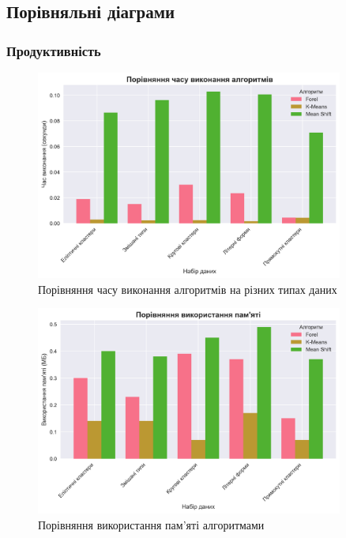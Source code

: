 \documentclass[12pt,a4paper]{article}
\begin{document}
\subsection{Порівняльні діаграми}

\subsubsection{Продуктивність}

\begin{figure}[H]
\centering
\includegraphics[width=0.9\textwidth]{clustering_visualizations/execution_time_comparison.png}
\caption{Порівняння часу виконання алгоритмів на різних типах даних}
\label{fig:time_comparison}
\end{figure}

\begin{figure}[H]
\centering
\includegraphics[width=0.9\textwidth]{clustering_visualizations/memory_usage_comparison.png}
\caption{Порівняння використання пам'яті алгоритмами}
\label{fig:memory_comparison}
\end{figure}
\end{document}
